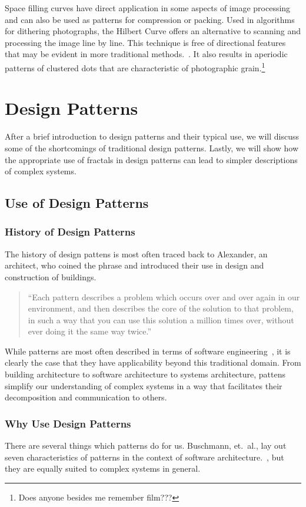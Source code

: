 \documentclass[jou,apacite]{apa6}
\begin{document}
Space filling curves have direct application in some aspects of image processing and can also be used as patterns for compression or packing.  Used in algorithms for dithering photographs, the Hilbert Curve offers an alternative to scanning and processing the image line by line.  This technique is free of directional features that may be evident in more traditional methods.~\cite[page 103]{Peitgen}.  It also results in aperiodic patterns of clustered dots that are characteristic of
photographic grain.\footnote{Does anyone besides me remember film???}

\section{Design Patterns}  %
After a brief introduction to design patterns and their typical use, we will discuss some of the shortcomings of traditional design patterns.  Lastly, we will show how the appropriate use of fractals in design patterns can lead to simpler descriptions of complex systems.

\subsection{Use of Design Patterns}
\subsubsection{History of Design Patterns}
The history of design pattens is most often traced back to Alexander, an architect, who coined the phrase and introduced their use in design and construction of buildings.  
\begin{quote}
  ``Each pattern describes a problem which occurs over and over again in our environment, and then describes the core of the solution to that problem, in such a way that you can use this solution a million times over, without ever doing it the same way twice.''~\cite{Alexander}
\end{quote}

While patterns are most often described in terms of software engineering~\cite{Gamma}, it is clearly the case that they have applicability beyond this traditional domain.  From building architecture to software architecture to systems architecture, pattens simplify our understanding of complex systems in a way that facilitates their decomposition and communication to others.

\subsubsection{Why Use Design Patterns}
There are several things which patterns do for us.  Buschmann, et.\ al., lay out seven characteristics of patterns in the context of software architecture.~\cite{Buschmann}, but they are equally suited to complex systems in general.
\end{document}
